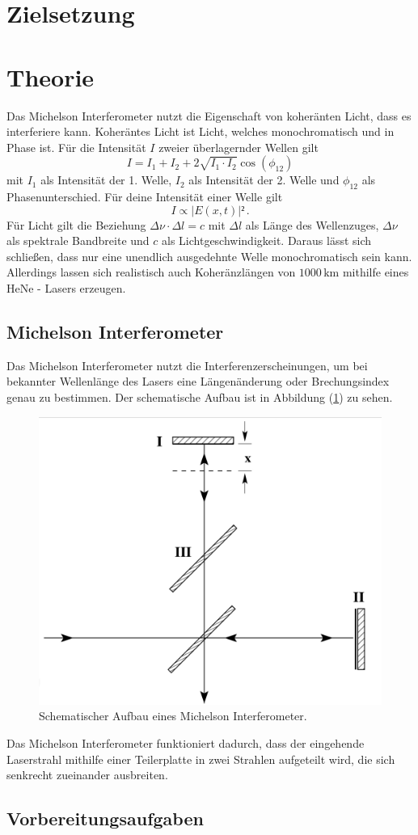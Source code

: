 \section{Zielsetzung}
\label{sec:Zielsetzung}

\section{Theorie}
\label{sec:Theorie}
Das Michelson Interferometer nutzt die Eigenschaft von koheränten Licht, dass es interferiere kann. Koheräntes Licht ist Licht, welches monochromatisch 
und in Phase ist. Für die Intensität $I$ zweier überlagernder Wellen gilt 
\begin{equation}
I = I_1 + I_2 + 2 \sqrt{I_1 \cdot I_2} \cos(\phi_{12})  
\end{equation}
mit $I_1$ als Intensität der 1. Welle, $I_2$ als Intensität der 2. Welle und $\phi_{12}$ als Phasenunterschied. Für deine Intensität einer Welle gilt 
\begin{equation}
    I \propto |E(x,t)|² \, .
\end{equation}
Für Licht gilt die Beziehung $\Delta \nu \cdot \Delta l = c$ mit $\Delta l$ als Länge des Wellenzuges, $\Delta \nu$ als spektrale Bandbreite und $c$ als 
Lichtgeschwindigkeit. Daraus lässt sich schließen, dass nur eine unendlich ausgedehnte Welle monochromatisch sein kann. 
Allerdings lassen sich realistisch auch Koheränzlängen von $1000 \, \unit{\kilo\meter}$ mithilfe eines HeNe - Lasers erzeugen. 
\subsection{Michelson Interferometer}
Das Michelson Interferometer nutzt die Interferenzerscheinungen, um bei bekannter Wellenlänge des Lasers eine Längenänderung oder Brechungsindex 
genau zu bestimmen. Der schematische Aufbau ist in Abbildung (\ref{fig:Aufbau}) zu sehen. 
\begin{figure}[H]
    \centering
    \includegraphics[width=0.6\linewidth]{"content/Bilder/V401.png"}
    \caption{Schematischer Aufbau eines Michelson Interferometer.}
    \label{fig:Aufbau}
\end{figure}
Das Michelson Interferometer funktioniert dadurch, dass der eingehende Laserstrahl mithilfe einer Teilerplatte in zwei Strahlen aufgeteilt wird, die sich senkrecht 
zueinander ausbreiten. 
\subsection{Vorbereitungsaufgaben}
\label{sec:Vorbereitungsaufgaben}
